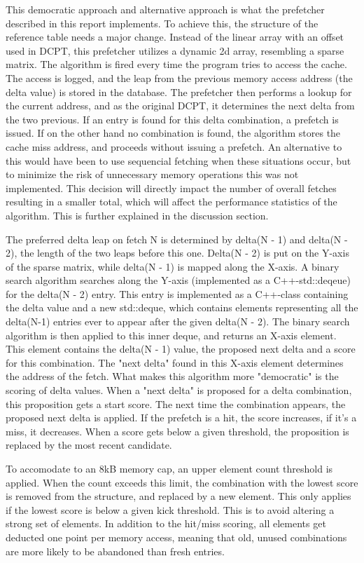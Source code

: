 This democratic approach and alternative approach is what the prefetcher described in this report implements. To achieve this, the structure of the reference table needs a major change. Instead of the linear array with an offset used in DCPT, this prefetcher utilizes a dynamic 2d array, resembling a sparse matrix. The algorithm is fired every time the program tries to access the cache. The access is logged, and the leap from the previous memory access address (the delta value) is stored in the database. The prefetcher then performs a lookup for the current address, and as the original DCPT, it determines the next delta from the two previous. If an entry is found for this delta combination, a prefetch is issued. If on the other hand no combination is found, the algorithm stores the cache miss address, and proceeds without issuing a prefetch. An alternative to this would have been to use sequencial fetching when these situations occur, but to minimize the risk of unnecessary memory operations this was not implemented. This decision will directly impact the number of overall fetches resulting in a smaller total, which will affect the performance statistics of the algorithm. This is further explained in the discussion section.   

The preferred delta leap on fetch N is determined by delta(N - 1) and delta(N - 2), the length of the two leaps before this one. Delta(N - 2) is put on the Y-axis of the sparse matrix, while delta(N - 1) is mapped along the X-axis. A binary search algorithm searches along the Y-axis (implemented as a C++-std::deqeue) for the delta(N - 2) entry. This entry is implemented as a C++-class containing the delta value and a new std::deque, which contains elements representing all the delta(N-1) entries ever to appear after the given delta(N - 2). The binary search algorithm is then applied to this inner deque, and returns an X-axis element. This element contains the delta(N - 1) value, the proposed next delta and a score for this combination. The "next delta" found in this X-axis element determines the address of the fetch. What makes this algorithm more "democratic" is the scoring of delta values. When a "next delta" is proposed for a delta combination, this proposition gets a start score. The next time the combination appears, the proposed next delta is applied. If the prefetch is a hit, the score increases, if it's a miss, it decreases. When a score gets below a given threshold, the proposition is replaced by the most recent candidate. 

To accomodate to an 8kB memory cap, an upper element count threshold is applied. When the count exceeds this limit, the combination with the lowest score is removed from the structure, and replaced by a new element. This only applies if the lowest score is below a given kick threshold. This is to avoid altering a strong set of elements. In addition to the hit/miss scoring, all elements get deducted one point per memory access, meaning that old, unused combinations are more likely to be abandoned than fresh entries.

